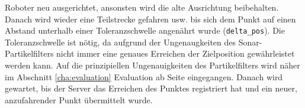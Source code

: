Roboter neu ausgerichtet, ansonsten wird die alte Ausrichtung beibehalten.
Danach wird wieder eine Teilstrecke gefahren usw. bis sich dem Punkt auf
einen Abstand unterhalb einer Toleranzschwelle angenährt wurde
(\lstinline|delta_pos|). 
Die Toleranzschwelle ist nötig, da aufgrund der Ungenaugkeiten des
Sonar-Partikelfilters nicht immer eine genaues Erreichen der
Zielposition gewährleistet werden kann.  Auf die prinzipiellen
Ungenauigkeiten des Partikelfilters wird näher im Abschnitt
\ref{cha:evaluation} Evaluation
ab Seite \pageref{cha:evaluation} eingegangen. 
Danach wird gewartet, bis der Server das Erreichen des Punktes registriert
hat und ein neuer, anzufahrender Punkt übermittelt wurde.






